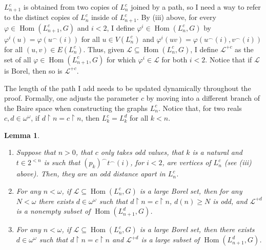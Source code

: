 \documentclass[11pt]{article}
\theoremstyle{plain}
\newtheorem{lemma}[theorem]{Lemma}
\theoremstyle{definition}
\theoremstyle{remark}
\DeclareMathOperator{\Hom}{Hom}
\begin{document}
$L^c_{n+1}$ is obtained from two copies of $L^c_n$ joined by a path, so I need a way to refer to the distinct copies of $L^c_n$ inside of $L^c_{n+1}$.
By (iii) above, for every $\varphi\in\Hom(L^c_{n+1},G)$ and $i<2$, I define $\varphi^i\in\Hom(L^c_n,G)$ by $\varphi^i(u)=\varphi(u^\frown (i))$ for all $u\in V(L^c_n)$ and $\varphi^i(uv)=\varphi(u^\frown(i),v^\frown(i))$ for all $(u,v)\in E(L^c_n)$.
Thus, given $\mathcal L\subseteq\Hom(L^c_n,G)$, I define $\mathcal L^{+c}$ as the set of all $\varphi\in\Hom(L^c_{n+1},G)$ for which $\varphi^i\in\mathcal L$ for both $i<2$.
Notice that if $\mathcal L$ is Borel, then so is $\mathcal L^{+c}$.

The length of the path I add needs to be updated dynamically throughout the proof.
Formally, one adjusts the parameter $c$ by moving into a different branch of the Baire space when constructing the graphs $L^c_n$.
Notice that, for two reals $c,d\in\omega^\omega$, if $d\restriction n=c\restriction n$, then $L^c_k=L^d_k$ for all $k<n$.

\begin{lemma}\label{lemma:Ln_basics}~ 
    \begin{enumerate}[label=(\alph*)]
        \item Suppose that $n>0$, that $c$ only takes odd values, that $k$ is a natural and $t\in2^{<n}$ is such that $(p_k)^\smallfrown t^\smallfrown(i)$, for $i<2$, are vertices of $L^c_n$ (see (iii) above). Then, they are an odd distance apart in $L^c_n$.

        \item For any $n<\omega$, if $\mathcal L\subseteq\Hom(L^c_n,G)$ is a large Borel set, then for any $N<\omega$ there exists $d\in\omega^\omega$ such that $d\restriction n=c\restriction n$, $d(n)\geq N$ is odd, and $\mathcal L^{+d}$ is a nonempty subset of $\Hom(L^{d}_{n+1},G)$.

        \item For any $n<\omega$, if $\mathcal L\subseteq\Hom(L^c_n,G)$ is a large Borel set, then there exists $d\in\omega^\omega$ such that $d\restriction n=c\restriction n$ and $\mathcal L^{+d}$ is a large subset of $\Hom(L^{d}_{n+1},G)$.
    \end{enumerate}
\end{lemma}
\end{document}
